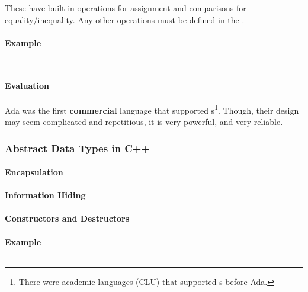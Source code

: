 These have built-in operations for assignment and comparisons for equality/inequality.
Any other operations must be defined in the .

\paragraph{Example}\label{par:Ada_Abstract_Data_Type_Example}
\inputminted[frame=lines,linenos]{ada}{./EDAP05-Concepts_Programming_Languages-Sections/Code/Class_Example-Stack-Ada-Package.ada}
\inputminted[frame=lines,linenos]{ada}{./EDAP05-Concepts_Programming_Languages-Sections/Code/Class_Example-Stack-Ada.ada}

\paragraph{Evaluation}\label{par:Ada_Abstract_Data_Type_Evaluation}
Ada was the first \textbf{commercial} language that supported s\footnote{There were academic languages (CLU) that supported s before Ada.}.
Though, their design may seem complicated and repetitious, it is very powerful, and very reliable.

\subsubsection{Abstract Data Types in C++}\label{subsubsec:Abstract_Data_Types_C++}
\paragraph{Encapsulation}\label{par:C++_Encapsulation}
\paragraph{Information Hiding}\label{par:C++_Info_Hiding}
\paragraph{Constructors and Destructors}\label{par:C++_Constructors_Destructors}
\paragraph{Example}\label{par:C++_Abstract_Data_Type_Example}
\inputminted[frame=lines,linenos]{c++}{./EDAP05-Concepts_Programming_Languages-Sections/Code/Class_Example-Stack-CPP.cpp}

